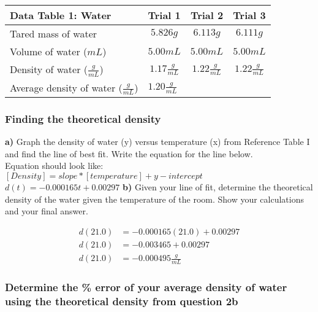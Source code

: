 \documentclass[a4paper,10pt]{article}
\begin{document}
\begin{table}[h!]
\label{tab:table1}
\renewcommand{\arraystretch}{1.5}
\begin{tabular}{|l|c|c|c|}
\hline
\textbf{Data Table 1: Water} & \textbf{Trial 1} & \textbf{Trial 2} & \textbf{Trial 3}\\
\hline
Tared mass of water & $5.826g$ & $6.113g$ & $6.111g$ \\
\hline
Volume of water ($mL$) & $5.00mL$ & $5.00mL$ & $5.00mL$ \\
\hline
Density of water ($\frac{g}{mL}$) & $1.17\frac{g}{mL}$ & $1.22\frac{g}{mL}$ & $1.22\frac{g}{mL}$\\
\hline
Average density of water ($\frac{g}{mL}$) & \multicolumn{2}{l}{$1.20\frac{g}{mL}$} & \\
\hline
\end{tabular}
\end{table}

\subsubsection*{Finding the theoretical density}
\begin{flushleft}
\textbf{a)} Graph the density of water (y) versus temperature (x) from Reference Table I and find the line of best fit. Write the equation for the line below.\\
\vspace{5mm}
Equation should look like:\\
\vspace{5mm}
$[Density] = slope * [temperature] + y-intercept$\\
\vspace{5mm}
$d(t) = -0.000165t + 0.00297$
\vspace{0.25in}
\textbf{b)} Given your line of fit, determine the theoretical density of the water given the temperature of the room. Show your calculations and your final answer. 
\end{flushleft}

\begin{align}
d(21.0) &= -0.000165(21.0) + 0.00297 \\
d(21.0) &= -0.003465 + 0.00297 \\
d(21.0) &= -0.000495\frac{g}{mL} 
\end{align}



\subsubsection*{Determine the \% error of your average density of water using the theoretical density from question 2b}
\end{document}
